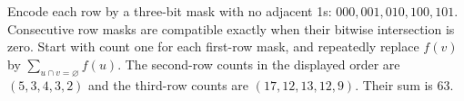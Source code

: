 Encode each row by a three-bit mask with no adjacent 1s: $000,001,010,100,101$. Consecutive row masks are compatible exactly when their bitwise intersection is zero. Start with count one for each first-row mask, and repeatedly replace $f(v)$ by $\sum_{u\cap v=\varnothing}f(u)$. The second-row counts in the displayed order are $(5,3,4,3,2)$ and the third-row counts are $(17,12,13,12,9)$. Their sum is $\boxed{63}$.

